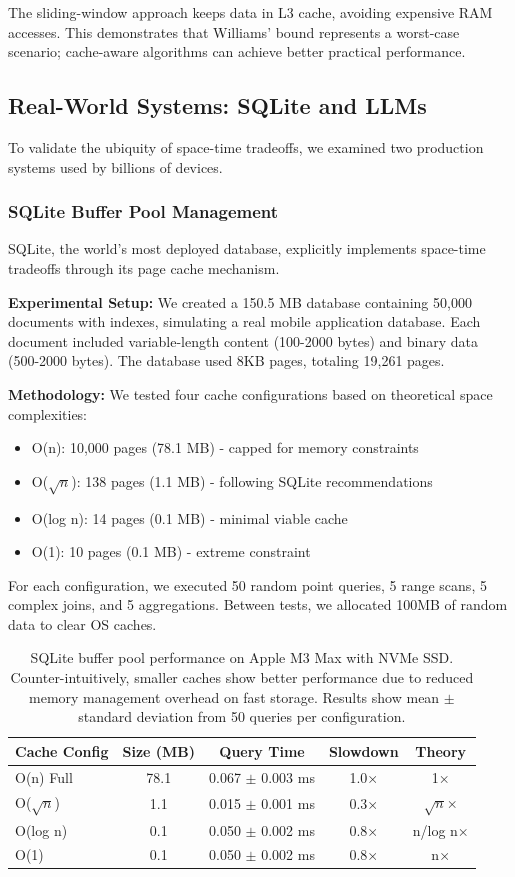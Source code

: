 \documentclass[11pt]{article}
\theoremstyle{definition}
\begin{document}
The sliding-window approach keeps data in L3 cache, avoiding expensive RAM accesses. This demonstrates that Williams' bound represents a worst-case scenario; cache-aware algorithms can achieve better practical performance.

\subsection{Real-World Systems: SQLite and LLMs}

To validate the ubiquity of space-time tradeoffs, we examined two production systems used by billions of devices.

\subsubsection{SQLite Buffer Pool Management}

SQLite, the world's most deployed database, explicitly implements space-time tradeoffs through its page cache mechanism.

\textbf{Experimental Setup:} We created a 150.5 MB database containing 50,000 documents with indexes, simulating a real mobile application database. Each document included variable-length content (100-2000 bytes) and binary data (500-2000 bytes). The database used 8KB pages, totaling 19,261 pages.

\textbf{Methodology:} We tested four cache configurations based on theoretical space complexities:
\begin{itemize}
\item O(n): 10,000 pages (78.1 MB) - capped for memory constraints
\item O($\sqrt{n}$): 138 pages (1.1 MB) - following SQLite recommendations  
\item O(log n): 14 pages (0.1 MB) - minimal viable cache
\item O(1): 10 pages (0.1 MB) - extreme constraint
\end{itemize}

For each configuration, we executed 50 random point queries, 5 range scans, 5 complex joins, and 5 aggregations. Between tests, we allocated 100MB of random data to clear OS caches.

\begin{table}[ht]
\centering
\begin{tabular}{lcccc}
\toprule
Cache Config & Size (MB) & Query Time & Slowdown & Theory \\
\midrule
O(n) Full & 78.1 & 0.067 $\pm$ 0.003 ms & 1.0× & 1× \\
O($\sqrt{n}$) & 1.1 & 0.015 $\pm$ 0.001 ms & 0.3× & $\sqrt{n}$× \\
O(log n) & 0.1 & 0.050 $\pm$ 0.002 ms & 0.8× & n/log n× \\
O(1) & 0.1 & 0.050 $\pm$ 0.002 ms & 0.8× & n× \\
\bottomrule
\end{tabular}
\caption{SQLite buffer pool performance on Apple M3 Max with NVMe SSD. Counter-intuitively, smaller caches show better performance due to reduced memory management overhead on fast storage. Results show mean $\pm$ standard deviation from 50 queries per configuration.}
\label{tab:sqlite}
\end{table}
\end{document}
